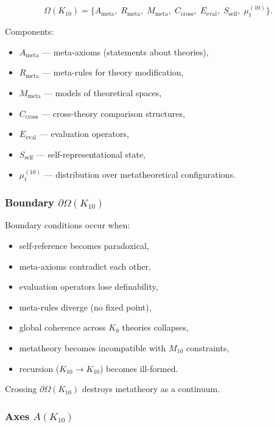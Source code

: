 \[
\Omega(K_{10})=
\{
A_{\mathrm{meta}},\;
R_{\mathrm{meta}},\;
M_{\mathrm{meta}},\;
C_{\mathrm{cross}},\;
E_{\mathrm{eval}},\;
S_{\mathrm{self}},\;
\mu^{(10)}_t
\}.
\]

Components:
\begin{itemize}
    \item $A_{\mathrm{meta}}$ — meta-axioms (statements about theories),
    \item $R_{\mathrm{meta}}$ — meta-rules for theory modification,
    \item $M_{\mathrm{meta}}$ — models of theoretical spaces,
    \item $C_{\mathrm{cross}}$ — cross-theory comparison structures,
    \item $E_{\mathrm{eval}}$ — evaluation operators,
    \item $S_{\mathrm{self}}$ — self-representational state,
    \item $\mu^{(10)}_t$ — distribution over metatheoretical configurations.
\end{itemize}

\subsubsection{Boundary $\partial\Omega(K_{10})$}

Boundary conditions occur when:
\begin{itemize}
    \item self-reference becomes paradoxical,
    \item meta-axioms contradict each other,
    \item evaluation operators lose definability,
    \item meta-rules diverge (no fixed point),
    \item global coherence across $K_9$ theories collapses,
    \item metatheory becomes incompatible with $M_{10}$ constraints,
    \item recursion ($K_{10}\to K_{10}$) becomes ill-formed.
\end{itemize}

Crossing $\partial\Omega(K_{10})$ destroys metatheory as a continuum.

\subsubsection{Axes $A(K_{10})$}

